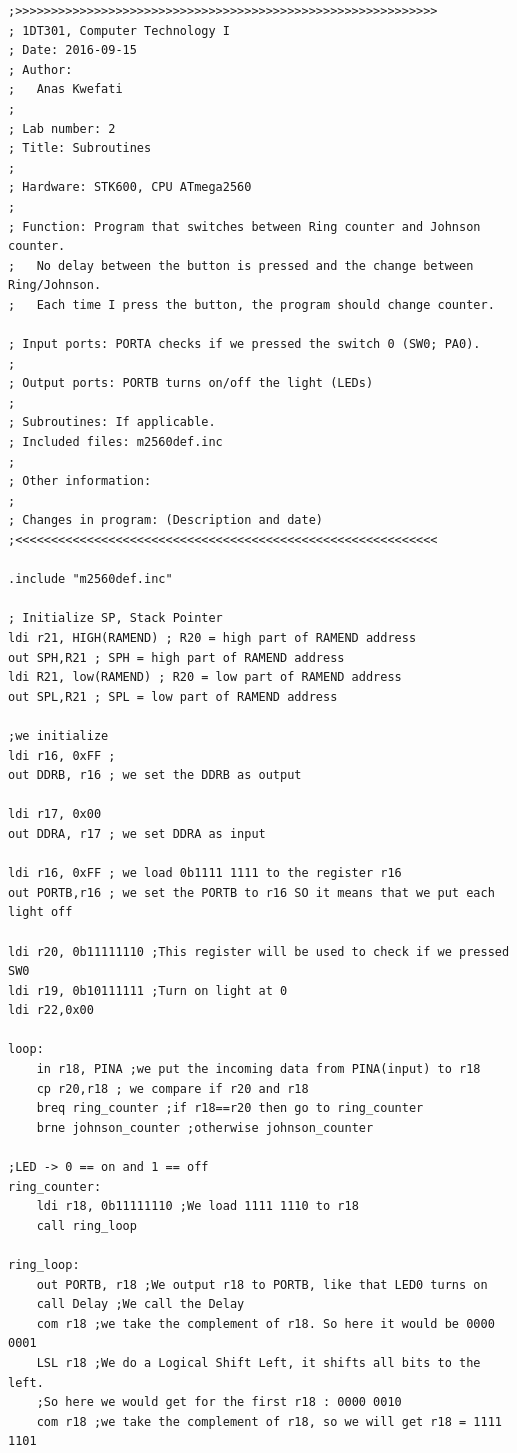 \documentclass[a4paper,12pt]{article}
\begin{document}
\begin{lstlisting}
;>>>>>>>>>>>>>>>>>>>>>>>>>>>>>>>>>>>>>>>>>>>>>>>>>>>>>>>>>>>
; 1DT301, Computer Technology I
; Date: 2016-09-15
; Author:
;	Anas Kwefati
;
; Lab number: 2
; Title: Subroutines
;
; Hardware: STK600, CPU ATmega2560
;
; Function: Program that switches between Ring counter and Johnson counter.
; 	No delay between the button is pressed and the change between Ring/Johnson.
; 	Each time I press the button, the program should change counter.

; Input ports: PORTA checks if we pressed the switch 0 (SW0; PA0).
;
; Output ports: PORTB turns on/off the light (LEDs)
;
; Subroutines: If applicable.
; Included files: m2560def.inc
;
; Other information:
;
; Changes in program: (Description and date)
;<<<<<<<<<<<<<<<<<<<<<<<<<<<<<<<<<<<<<<<<<<<<<<<<<<<<<<<<<<<

.include "m2560def.inc"

; Initialize SP, Stack Pointer
ldi r21, HIGH(RAMEND) ; R20 = high part of RAMEND address
out SPH,R21 ; SPH = high part of RAMEND address
ldi R21, low(RAMEND) ; R20 = low part of RAMEND address
out SPL,R21 ; SPL = low part of RAMEND address

;we initialize
ldi r16, 0xFF ;
out DDRB, r16 ; we set the DDRB as output

ldi r17, 0x00
out DDRA, r17 ; we set DDRA as input

ldi r16, 0xFF ; we load 0b1111 1111 to the register r16
out PORTB,r16 ; we set the PORTB to r16 SO it means that we put each light off

ldi r20, 0b11111110 ;This register will be used to check if we pressed SW0
ldi r19, 0b10111111 ;Turn on light at 0
ldi r22,0x00

loop:
	in r18, PINA ;we put the incoming data from PINA(input) to r18
	cp r20,r18 ; we compare if r20 and r18
	breq ring_counter ;if r18==r20 then go to ring_counter
	brne johnson_counter ;otherwise johnson_counter

;LED -> 0 == on and 1 == off
ring_counter:
	ldi r18, 0b11111110 ;We load 1111 1110 to r18
	call ring_loop

ring_loop:
	out PORTB, r18 ;We output r18 to PORTB, like that LED0 turns on
	call Delay ;We call the Delay
	com r18 ;we take the complement of r18. So here it would be 0000 0001
	LSL r18 ;We do a Logical Shift Left, it shifts all bits to the left.
	;So here we would get for the first r18 : 0000 0010
	com r18 ;we take the complement of r18, so we will get r18 = 1111 1101


\end{lstlisting}
\end{document}
